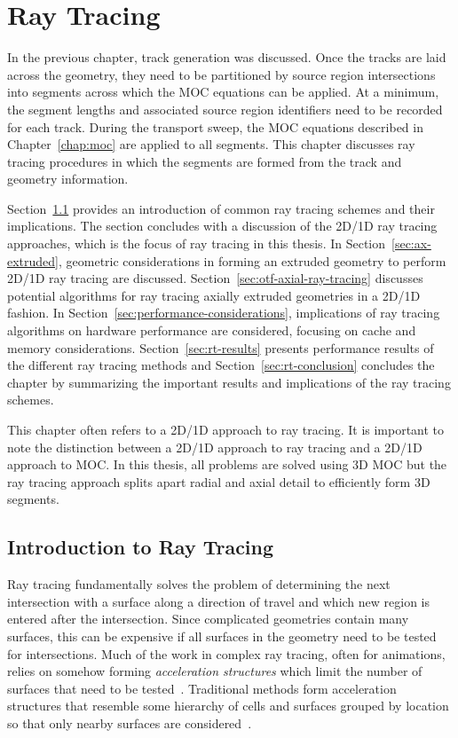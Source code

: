 \chapter{Ray Tracing}
\label{chap:ray-tracing}

In the previous chapter, track generation was discussed. Once the tracks are laid across the geometry, they need to be partitioned by source region intersections into segments across which the \ac{MOC} equations can be applied. At a minimum, the segment lengths and associated source region identifiers need to be recorded for each track. During the transport sweep, the \ac{MOC} equations described in Chapter~\ref{chap:moc} are applied to all segments. This chapter discusses ray tracing procedures in which the segments are formed from the track and geometry information. 

Section~\ref{sec:rt-intro} provides an introduction of common ray tracing schemes and their implications. The section concludes with a discussion of the 2D/1D ray tracing approaches, which is the focus of ray tracing in this thesis. In Section~\ref{sec:ax-extruded}, geometric considerations in forming an extruded geometry to perform 2D/1D ray tracing are discussed. Section~\ref{sec:otf-axial-ray-tracing} discusses potential algorithms for ray tracing axially extruded geometries in a 2D/1D fashion. In Section~\ref{sec:performance-considerations}, implications of ray tracing algorithms on hardware performance are considered, focusing on cache and memory considerations. Section~\ref{sec:rt-results} presents performance results of the different ray tracing methods and Section~\ref{sec:rt-conclusion} concludes the chapter by summarizing the important results and implications of the ray tracing schemes.

This chapter often refers to a 2D/1D approach to ray tracing. It is important to note the distinction between a 2D/1D approach to ray tracing and a 2D/1D approach to \ac{MOC}. In this thesis, all problems are solved using 3D \ac{MOC} but the ray tracing approach splits apart radial and axial detail to efficiently form 3D segments.

\section{Introduction to Ray Tracing}
\label{sec:rt-intro}

Ray tracing fundamentally solves the problem of determining the next intersection with a surface along a direction of travel and which new region is entered after the intersection. Since complicated geometries contain many surfaces, this can be expensive if all surfaces in the geometry need to be tested for intersections. Much of the work in complex ray tracing, often for animations, relies on somehow forming \textit{acceleration structures} which limit the number of surfaces that need to be tested~\cite{acceleration-structures}. Traditional methods form acceleration structures that resemble some hierarchy of cells and surfaces grouped by location so that only nearby surfaces are considered~\cite{acc-struct-hierarchy}.

